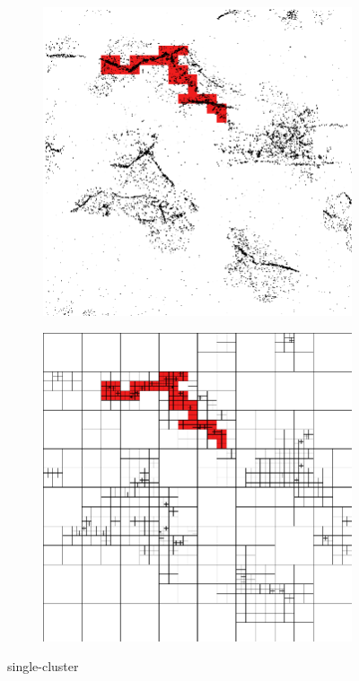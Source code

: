 \begin{figure}[tbhp]
	\centering
	\begin{subfigure}[c]{0.48\linewidth}
		\includegraphics[width=\textwidth]{single-cluster.png}
		\caption{}\label{fig:single-cluster-points}
	\end{subfigure}%
	\quad
	\begin{subfigure}[c]{0.48\linewidth}
		\includegraphics[width=\textwidth]{single-cluster-lines.png}
		\caption{}\label{fig:single-cluster-lines}
	\end{subfigure}
	\caption{single-cluster} \label{fig:single-cluster}
\end{figure}

